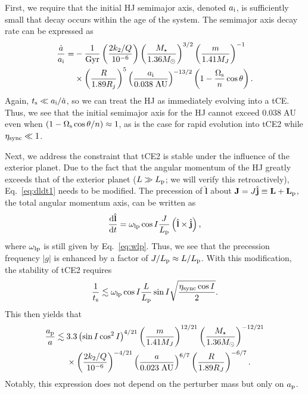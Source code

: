 \documentclass[
        fleqn,
        usenatbib,
    ]{mnras}
\newcommand*{\rd}[2]{\frac{\mathrm{d}#1}{\mathrm{d}#2}}
\newcommand*{\abs}[1]{\left|#1\right|}
\newcommand*{\p}[1]{\left(#1\right)}
\newcommand*{\bm}[1]{\mathbf{#1}}
\newcommand*{\uv}[1]{\hat{\mathbf{#1}}}
\begin{document}
First, we require that the initial HJ semimajor axis, denoted $a_{\rm i}$, is
sufficiently small that decay occurs within the age of the system. The semimajor
axis decay rate can be expressed as
\begin{align}
    \frac{\dot{a}}{a_{\rm i}}
        =& -\frac{1}{\mathrm{Gyr}}
            \p{\frac{2k_2/Q}{10^{-6}}}
            \p{\frac{M_\star}{1.36 M_{\odot}}}^{3/2}
            \p{\frac{m}{1.41M_J}}^{-1}\nonumber\\
        &\times \p{\frac{R}{1.89R_j}}^5
            \p{\frac{a_{\rm i}}{0.038\;\mathrm{AU}}}^{-13/2}
            \p{1 - \frac{\Omega_{\rm s}}{n}\cos \theta}.
            \label{eq:hj_adot}
\end{align}
Again, $t_{\rm s} \ll a_{\rm i} / \dot{a}$, so we can treat the HJ as
immediately evolving into a tCE\@. Thus, we see that the initial semimajor axis
for the HJ cannot exceed $0.038\;\mathrm{AU}$ even when $\p{1 - \Omega_{\rm
s}\cos \theta/n} \approx 1$, as is the case for rapid evolution into tCE2 while
$\eta_{\rm sync} \ll 1$.

Next, we address the constraint that tCE2 is stable under the influence of the
exterior planet. Due to the fact that the angular momentum of the HJ greatly
exceeds that of the exterior planet ($L \gg L_{\rm p}$; we will verify this
retroactively), Eq.~\eqref{eq:dldt1} needs to be modified. The precession of
$\uv{l}$ about $\bm{J} = J\uv{j} \equiv \bm{L} + \bm{L}_{\rm p}$, the total
angular momentum axis, can be written as
\begin{equation}
    \rd{\uv{l}}{t} = \omega_{\rm lp}\cos I \frac{J}{L_{\rm p}}
        \p{\uv{l} \times \uv{j}},
\end{equation}
where $\omega_{\rm lp}$ is still given by Eq.~\eqref{eq:wlp}. Thus, we see that
the precession frequency $\abs{g}$ is enhanced by a factor of $J / L_{\rm p}
\approx L / L_{\rm p}$. With this modification, the stability of tCE2 requires
\begin{equation}
    \frac{1}{t_{\rm s}} \lesssim \omega_{\rm lp}\cos I \frac{L}{L_{\rm p}}
        \sin I \sqrt{\frac{\eta_{\rm sync}\cos I}{2}}.
\end{equation}
This then yields that
\begin{align}
    \frac{a_{\rm p}}{a}
        \lesssim{}& 3.3 \p{\sin I \cos^2 I}^{4/21}
            \p{\frac{m}{1.41 M_J}}^{12/21}
            \p{\frac{M_\star}{1.36 M_{\odot}}}^{-12/21}\nonumber\\
        &\times \p{\frac{2k_2/Q}{10^{-6}}}^{-4/21}
            \p{\frac{a}{0.023\;\mathrm{AU}}}^{6/7}
            \p{\frac{R}{1.89 R_J}}^{-6/7}.\label{eq:hj_tce2_stab}
\end{align}
Notably, this expression does not depend on the perturber mass but only on
$a_{\rm p}$.
\end{document}
